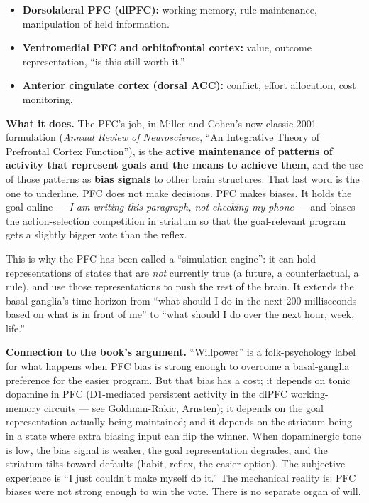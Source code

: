 \begin{itemize}
\tightlist
\item
  \textbf{Dorsolateral PFC (dlPFC):} working memory, rule maintenance, manipulation of held information.
\item
  \textbf{Ventromedial PFC and orbitofrontal cortex:} value, outcome representation, ``is this still worth it.''
\item
  \textbf{Anterior cingulate cortex (dorsal ACC):} conflict, effort allocation, cost monitoring.
\end{itemize}

\textbf{What it does.} The PFC's job, in Miller and Cohen's now-classic 2001 formulation (\emph{Annual Review of Neuroscience}, ``An Integrative Theory of Prefrontal Cortex Function''), is the \textbf{active maintenance of patterns of activity that represent goals and the means to achieve them}, and the use of those patterns as \textbf{bias signals} to other brain structures. That last word is the one to underline. PFC does not make decisions. PFC makes biases. It holds the goal online --- \emph{I am writing this paragraph, not checking my phone} --- and biases the action-selection competition in striatum so that the goal-relevant program gets a slightly bigger vote than the reflex.

This is why the PFC has been called a ``simulation engine'': it can hold representations of states that are \emph{not} currently true (a future, a counterfactual, a rule), and use those representations to push the rest of the brain. It extends the basal ganglia's time horizon from ``what should I do in the next 200 milliseconds based on what is in front of me'' to ``what should I do over the next hour, week, life.''

\textbf{Connection to the book's argument.} ``Willpower'' is a folk-psychology label for what happens when PFC bias is strong enough to overcome a basal-ganglia preference for the easier program. But that bias has a cost; it depends on tonic dopamine in PFC (D1-mediated persistent activity in the dlPFC working-memory circuits --- see Goldman-Rakic, Arnsten); it depends on the goal representation actually being maintained; and it depends on the striatum being in a state where extra biasing input can flip the winner. When dopaminergic tone is low, the bias signal is weaker, the goal representation degrades, and the striatum tilts toward defaults (habit, reflex, the easier option). The subjective experience is ``I just couldn't make myself do it.'' The mechanical reality is: PFC biases were not strong enough to win the vote. There is no separate organ of will.

